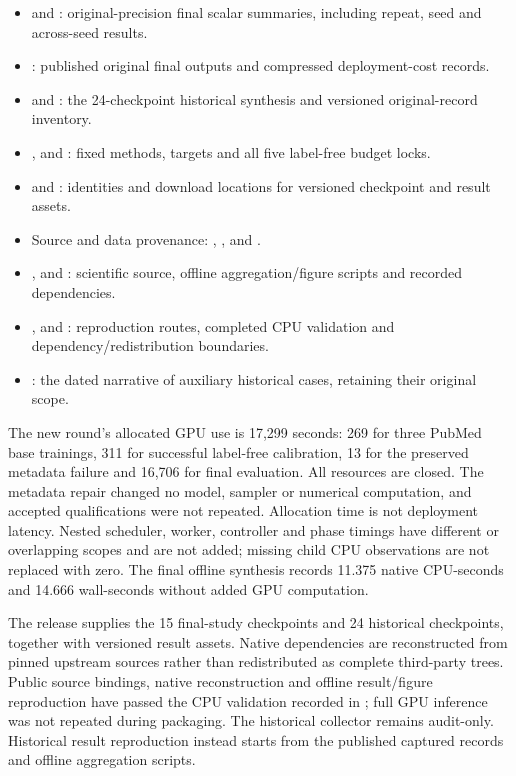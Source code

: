 \documentclass[11pt]{article}
\begin{document}
\begin{itemize}
\item {} and : original-precision final scalar summaries, including repeat, seed and across-seed results.
\item {}: published original final outputs and compressed deployment-cost records.
\item {} and : the 24-checkpoint historical synthesis and versioned original-record inventory.
\item {},  and : fixed methods, targets and all five label-free budget locks.
\item {} and : identities and download locations for versioned checkpoint and result assets.
\item Source and data provenance: ,\newline
{}, and .
\item {},  and : scientific source, offline aggregation/figure scripts and recorded dependencies.
\item {},  and : reproduction routes, completed CPU validation and dependency/redistribution boundaries.
\item {}: the dated narrative of auxiliary historical cases, retaining their original scope.
\end{itemize}

The new round's allocated GPU use is 17,299 seconds: 269 for three PubMed base trainings, 311 for successful label-free calibration, 13 for the preserved metadata failure and 16,706 for final evaluation. All resources are closed. The metadata repair changed no model, sampler or numerical computation, and accepted qualifications were not repeated. Allocation time is not deployment latency. Nested scheduler, worker, controller and phase timings have different or overlapping scopes and are not added; missing child CPU observations are not replaced with zero. The final offline synthesis records 11.375 native CPU-seconds and 14.666 wall-seconds without added GPU computation.

The release supplies the 15 final-study checkpoints and 24 historical checkpoints, together with versioned result assets. Native dependencies are reconstructed from pinned upstream sources rather than redistributed as complete third-party trees. Public source bindings, native reconstruction and offline result/figure reproduction have passed the CPU validation recorded in ; full GPU inference was not repeated during packaging. The historical collector remains audit-only. Historical result reproduction instead starts from the published captured records and offline aggregation scripts.

\clearpage


\end{document}

